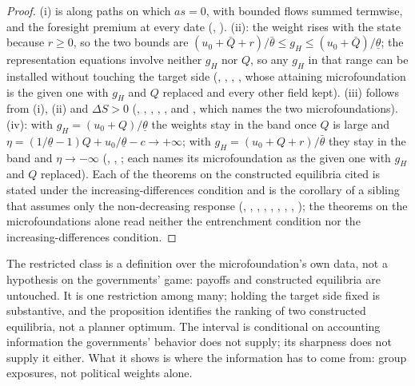 \begin{proof}
(i) is  along paths on which $as=0$, with bounded
flows summed termwise, and the foresight premium at every date
(, ). (ii): the weight rises with the
state because $r\ge0$, so the two bounds are
$(u_0+\bar Q+r)/\bar\theta\le g_H\le(u_0+\bar Q)/\underline\theta$; the
representation equations involve neither $g_H$ nor $Q$, so any $g_H$ in that
range can be installed without touching the target side
(, ,
, , whose
attaining microfoundation is the given one with $g_H$ and $Q$ replaced and every
other field kept). (iii) follows from
(i), (ii) and $\Delta S>0$ (, ,
, , ,
and , which names the two
microfoundations). (iv): with $g_H=(u_0+Q)/\underline\theta$
the weights stay in the band once $Q$ is large and
$\eta=(1/\underline\theta-1)Q+u_0/\underline\theta-c\to+\infty$; with
$g_H=(u_0+Q+r)/\bar\theta$ they stay in the band and $\eta\to-\infty$
(,
,
; each names its microfoundation as
the given one with $g_H$ and $Q$ replaced). Each of the theorems on the constructed equilibria
cited is stated under the increasing-differences condition and is the corollary of a sibling that
assumes only the non-decreasing response
(,
, ,
,
,
,
,
,
); the
theorems on the microfoundations alone read neither the entrenchment condition nor the increasing-differences condition.
\end{proof}

The restricted class is a definition over the microfoundation's own data, not a
hypothesis on the governments' game: payoffs and constructed equilibria are
untouched. It is one restriction among many; holding the target side fixed is
substantive, and the proposition identifies the ranking of two constructed equilibria, not a
planner optimum. The interval is conditional on accounting information the
governments' behavior does not supply; its sharpness does not supply it
either. What it shows is where the information has to come from:
group exposures, not political weights alone.
